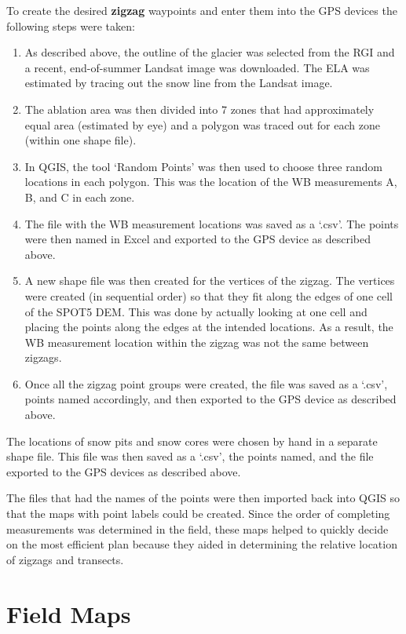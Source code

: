 \documentclass{sfuthesis}
\begin{document}
\begin{appendices}
To create the desired \textbf{zigzag} waypoints and enter them into the GPS devices the following steps were taken:
\begin{enumerate}
\item As described above, the outline of the glacier was selected from the RGI and a recent, end-of-summer Landsat image was downloaded. The ELA was estimated by tracing out the snow line from the Landsat image.
\item The ablation area was then divided into 7 zones that had approximately equal area (estimated by eye) and a polygon was traced out for each zone (within one shape file). 
\item In QGIS, the tool `Random Points' was then used to choose three random locations in each polygon. This was the location of the WB measurements A, B, and C in each zone. 
\item The file with the WB measurement locations was saved as a `.csv'. The points were then named in Excel and exported to the GPS device as described above.
\item A new shape file was then created for the vertices of the zigzag. The vertices were created (in sequential order) so that they fit along the edges of one cell of the SPOT5 DEM. This was done by actually looking at one cell and placing the points along the edges at the intended locations. As a result, the WB measurement location within the zigzag was not the same between zigzags. 
\item Once all the zigzag point groups were created, the file was saved as a `.csv', points named accordingly, and then exported to the GPS device as described above. 
\end{enumerate}

The locations of snow pits and snow cores were chosen by hand in a separate shape file. This file was then saved as a `.csv', the points named, and the file exported to the GPS devices as described above. 

The files that had the names of the points were then imported back into QGIS so that the maps with point labels could be created.  Since the order of completing measurements was determined in the field, these maps helped to quickly decide on the most efficient plan because they aided in determining the relative location of zigzags and transects.



\chapter{Field Maps}



\end{appendices}
\end{document}

